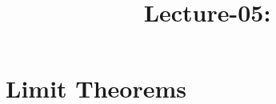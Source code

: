 \documentclass[a4paper,10pt, english]{article}
\title{Lecture-05:}
\author{}
\begin{document}
\maketitle
\section{Limit Theorems}
\end{document}
